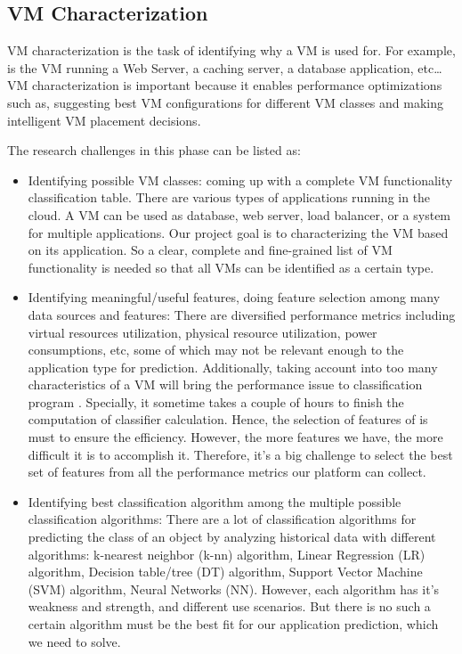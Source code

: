 \subsection{VM Characterization}
VM characterization is the task of identifying why a VM is used for. For example, is the VM running a Web Server, a caching server, a database application, etc… VM characterization is important because it enables performance optimizations such as, suggesting best VM configurations for different VM classes and making intelligent VM placement decisions. 

The research challenges in this phase can be listed as:
\begin{itemize}
\item Identifying possible VM classes: coming up with a complete VM functionality classification table. There are various types of applications running in the cloud. A VM can be used as database, web server, load balancer, or a system for multiple applications. Our project goal is to characterizing the VM based on its application. So a clear, complete and fine-grained list of VM functionality is needed so that all VMs can be identified as a certain type.

\item Identifying meaningful/useful features, doing feature selection among many data sources and features: There are diversified performance metrics including virtual resources utilization, physical resource utilization, power consumptions, etc, some of which may not be relevant enough to the application type for prediction. Additionally, taking account into too many characteristics of a VM will bring the performance issue to classification program . Specially, it sometime takes a couple of hours to finish the computation of classifier calculation. Hence, the selection of features of is must to ensure the efficiency. However, the more features we have, the more difficult it is to accomplish it. Therefore, it's a big challenge to select the best set of features from all the performance metrics our platform can collect.

\item Identifying best classification algorithm among the multiple possible classification algorithms: There are a lot of classification algorithms for predicting the class of an object by analyzing historical data with different algorithms: k-nearest neighbor (k-nn) algorithm, Linear Regression (LR) algorithm, Decision table/tree (DT) algorithm, Support Vector Machine (SVM) algorithm, Neural Networks (NN). However, each algorithm has it's weakness and strength, and different use scenarios. But there is no such a certain algorithm must be the best fit for our application prediction, which we need to solve.


\end{itemize}
